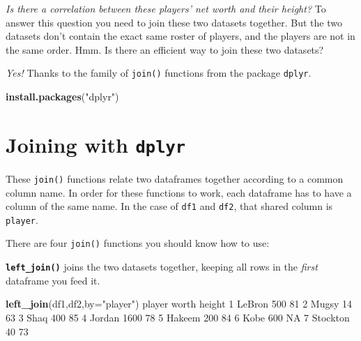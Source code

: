 \documentclass[]{book}
\newenvironment{Shaded}{\begin{snugshade}}{\end{snugshade}}
\newcommand{\DataTypeTok}[1]{\textcolor[rgb]{0.13,0.29,0.53}{#1}}
\newcommand{\DecValTok}[1]{\textcolor[rgb]{0.00,0.00,0.81}{#1}}
\newcommand{\KeywordTok}[1]{\textcolor[rgb]{0.13,0.29,0.53}{\textbf{#1}}}
\newcommand{\NormalTok}[1]{#1}
\newcommand{\OtherTok}[1]{\textcolor[rgb]{0.56,0.35,0.01}{#1}}
\newcommand{\StringTok}[1]{\textcolor[rgb]{0.31,0.60,0.02}{#1}}
\begin{document}
\emph{Is there a correlation between these players' net worth and their height?} To answer this question you need to join these two datasets together. But the two datasets don't contain the exact same roster of players, and the players are not in the same order. Hmm. Is there an efficient way to join these two datasets?

\emph{Yes!} Thanks to the family of \texttt{join()} functions from the package \texttt{dplyr}.

\begin{Shaded}
\begin{Highlighting}[]
\KeywordTok{install.packages}\NormalTok{(}\StringTok{"dplyr"}\NormalTok{)}
\end{Highlighting}
\end{Shaded}

\hypertarget{joining-with-dplyr}{%
\section*{\texorpdfstring{Joining with \texttt{dplyr}}{Joining with dplyr}}\label{joining-with-dplyr}}

These \texttt{join()} functions relate two dataframes together according to a common column name. In order for these functions to work, each dataframe has to have a column of the same name. In the case of \texttt{df1} and \texttt{df2}, that shared column is \texttt{player}.

There are four \texttt{join()} functions you should know how to use:

\textbf{\texttt{left\_join()}} joins the two datasets together, keeping all rows in the \emph{first} dataframe you feed it.

\begin{Shaded}
\begin{Highlighting}[]
\KeywordTok{left_join}\NormalTok{(df1,df2,}\DataTypeTok{by=}\StringTok{"player"}\NormalTok{)}
\NormalTok{    player worth height}
\DecValTok{1}\NormalTok{   LeBron   }\DecValTok{500}     \DecValTok{81}
\DecValTok{2}\NormalTok{    Mugsy    }\DecValTok{14}     \DecValTok{63}
\DecValTok{3}\NormalTok{     Shaq   }\DecValTok{400}     \DecValTok{85}
\DecValTok{4}\NormalTok{   Jordan  }\DecValTok{1600}     \DecValTok{78}
\DecValTok{5}\NormalTok{   Hakeem   }\DecValTok{200}     \DecValTok{84}
\DecValTok{6}\NormalTok{     Kobe   }\DecValTok{600}     \OtherTok{NA}
\DecValTok{7}\NormalTok{ Stockton    }\DecValTok{40}     \DecValTok{73}
\end{Highlighting}
\end{Shaded}
\end{document}
